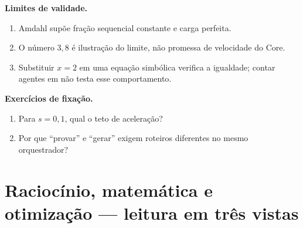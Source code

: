 \begin{aviso}
\textbf{Limites de validade.}
\begin{enumerate}[leftmargin=1.3em,itemsep=1pt]
  \item Amdahl supõe fração sequencial constante e carga perfeita.
  \item O número $3{,}8$ é ilustração do limite, não promessa de velocidade do Core.
  \item Substituir $x=2$ em uma equação simbólica verifica a igualdade; contar agentes em  não testa esse comportamento.
\end{enumerate}
\end{aviso}

\begin{resultado}
\textbf{Exercícios de fixação.}
\begin{enumerate}[leftmargin=1.3em,itemsep=2pt]
  \item Para $s=0{,}1$, qual o teto de aceleração?
  \item Por que ``provar'' e ``gerar'' exigem roteiros diferentes no mesmo orquestrador?
\end{enumerate}
\end{resultado}


\clearpage\section{Raciocínio, matemática e otimização — leitura em três vistas}\label{arch:AR10}





